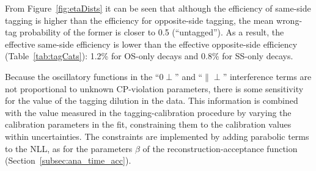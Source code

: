 From Figure~\ref{fig:etaDists} it can be seen that although the efficiency of same-side tagging is higher than the efficiency for
opposite-side tagging, the mean wrong-tag probability of the former is closer to 0.5 (``untagged''). As a result, the effective same-side
efficiency is lower than the effective opposite-side efficiency (Table~\ref{tab:tagCats}): 1.2\% for OS-only decays and 0.8\% for SS-only
decays.

Because the oscillatory functions in the ``0$\perp$'' and ``$\parallel\perp$'' interference terms are not proportional to unknown
CP-violation parameters, there is some sensitivity for the value of the tagging dilution in the \BstoJpsiKK{} data. This information is
combined with the value measured in the tagging-calibration procedure by varying the calibration parameters in the fit, constraining them
to the calibration values within uncertainties. The constraints are implemented by adding parabolic terms to the NLL, as for the parameters
$\beta$ of the reconstruction-acceptance function (Section~\ref{subsec:ana_time_acc}).

